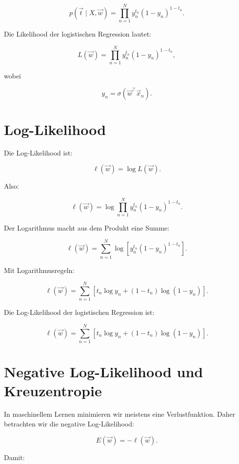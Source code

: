\[
    p(\vec{t}\mid X,\vec{w})
    =
    \prod_{n=1}^{N}
    y_n^{t_n}
    (1-y_n)^{1-t_n}.
\]

\begin{definitionbox}
Die Likelihood der logistischen Regression lautet:

\[
    L(\vec{w})
    =
    \prod_{n=1}^{N}
    y_n^{t_n}
    (1-y_n)^{1-t_n},
\]

wobei

\[
    y_n
    =
    \sigma(\vec{w}^{\top}\vec{x}_n).
\]
\end{definitionbox}

\section{Log-Likelihood}

Die Log-Likelihood ist:

\[
    \ell(\vec{w})
    =
    \log L(\vec{w}).
\]

Also:

\[
    \ell(\vec{w})
    =
    \log
    \prod_{n=1}^{N}
    y_n^{t_n}
    (1-y_n)^{1-t_n}.
\]

Der Logarithmus macht aus dem Produkt eine Summe:

\[
    \ell(\vec{w})
    =
    \sum_{n=1}^{N}
    \log
    \left[
        y_n^{t_n}
        (1-y_n)^{1-t_n}
    \right].
\]

Mit Logarithmusregeln:

\[
    \ell(\vec{w})
    =
    \sum_{n=1}^{N}
    \left[
        t_n\log y_n
        +
        (1-t_n)\log(1-y_n)
    \right].
\]

\begin{definitionbox}
Die Log-Likelihood der logistischen Regression ist:

\[
    \ell(\vec{w})
    =
    \sum_{n=1}^{N}
    \left[
        t_n\log y_n
        +
        (1-t_n)\log(1-y_n)
    \right].
\]
\end{definitionbox}

\section{Negative Log-Likelihood und Kreuzentropie}

In maschinellem Lernen minimieren wir meistens eine Verlustfunktion.
Daher betrachten wir die negative Log-Likelihood:

\[
    E(\vec{w})
    =
    -\ell(\vec{w}).
\]

Damit:

